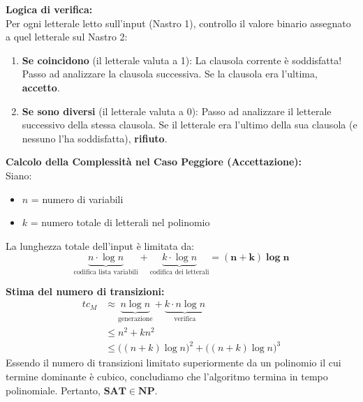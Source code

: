 \vspace{0.4cm}
\textbf{Logica di verifica:} \\
Per ogni letterale letto sull'input (Nastro 1), controllo il valore binario assegnato a quel letterale sul Nastro 2:
\begin{enumerate}
    \item \textbf{Se coincidono} (il letterale valuta a 1): La clausola corrente è soddisfatta! Passo ad analizzare la clausola successiva. Se la clausola era l'ultima, \textbf{accetto}.
    \item \textbf{Se sono diversi} (il letterale valuta a 0): Passo ad analizzare il letterale successivo della stessa clausola. Se il letterale era l'ultimo della sua clausola (e nessuno l'ha soddisfatta), \textbf{rifiuto}.
\end{enumerate}


\vspace{0.6cm}
\textbf{Calcolo della Complessità nel Caso Peggiore (Accettazione):} \\
Siano:
\begin{itemize}
    \item $n$ = numero di variabili
    \item $k$ = numero totale di letterali nel polinomio
\end{itemize}

La lunghezza totale dell'input è limitata da:
$$ \underbrace{n \cdot \log n}_{\text{codifica lista variabili}} + \underbrace{k \cdot \log n}_{\text{codifica dei letterali}} = \mathbf{(n+k) \log n} $$

\textbf{Stima del numero di transizioni:}
\begin{align*}
    tc_M &\approx \underbrace{n \log n}_{\text{generazione}} + \underbrace{k \cdot n \log n}_{\text{verifica}} \\
    &\le n^2 + k n^2 \\
    &\le \Big((n+k) \log n\Big)^2 + \Big((n+k) \log n\Big)^3
\end{align*}
Essendo il numero di transizioni limitato superiormente da un polinomio il cui termine dominante è cubico, concludiamo che l'algoritmo termina in tempo polinomiale. Pertanto, $\mathbf{SAT \in NP}$.
















